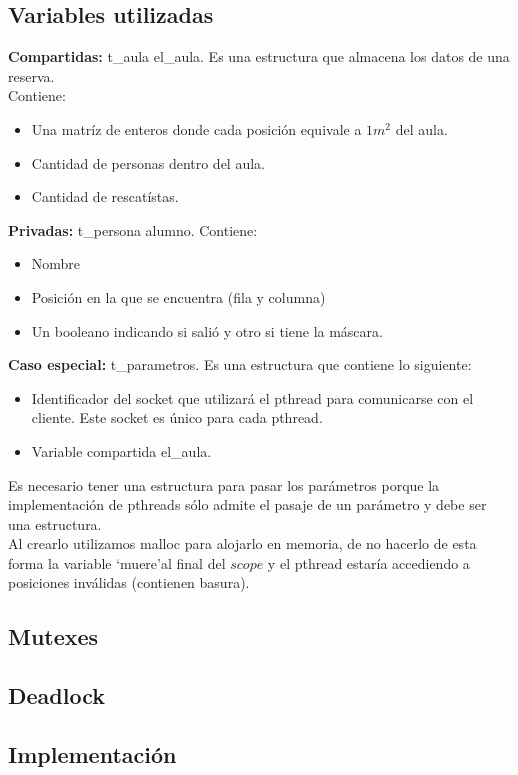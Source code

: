 \subsection{Variables utilizadas}
\textbf{Compartidas:} t\_aula el\_aula. Es una estructura que almacena los datos de una reserva.\\
Contiene: 
\begin{itemize}
 \item Una matríz de enteros donde cada posición equivale a $1m^{2}$ del aula.
 \item Cantidad de personas dentro del aula.
 \item Cantidad de rescatístas.
\end{itemize}

\textbf{Privadas:} t\_persona alumno. 
Contiene:
\begin{itemize}
 \item Nombre
 \item Posición en la que se encuentra (fila y columna)
 \item Un booleano indicando si salió y otro si tiene la máscara.
\end{itemize}

\textbf{Caso especial:} t\_parametros. Es una estructura que contiene lo siguiente:
\begin{itemize}
 \item Identificador del socket que utilizará el pthread para comunicarse con el cliente.
 Este socket es único para cada pthread.
 \item Variable compartida el\_aula.
\end{itemize}

Es necesario tener una estructura para pasar los parámetros porque la implementación de pthreads sólo admite el pasaje de un parámetro y debe
ser una estructura.\\
Al crearlo utilizamos malloc para alojarlo en memoria, de no hacerlo de esta forma la variable \textquoteleft muere\textquoteright al final del $scope$ y
el pthread estaría accediendo a posiciones inválidas (contienen basura).\\

\subsection{Mutexes}

\subsection{Deadlock}

\subsection{Implementación}
